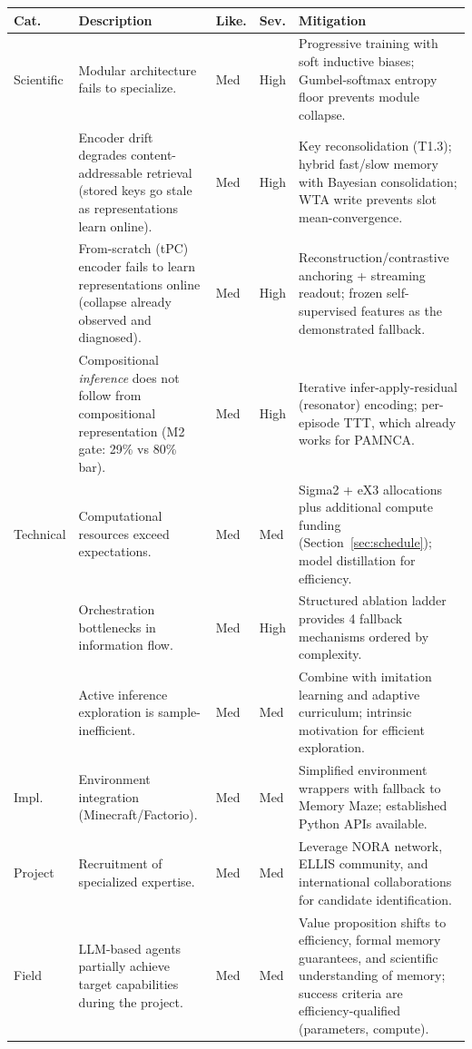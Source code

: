 {\small
\noindent
\begin{tabularx}{\textwidth}{@{}p{1.3cm}Xp{0.8cm}p{0.8cm}X@{}}
\toprule
\textbf{Cat.} & \textbf{Description} & \textbf{Like.} & \textbf{Sev.} & \textbf{Mitigation} \\
\midrule
Scientific & Modular architecture fails to specialize. & Med & High & Progressive training with soft inductive biases; Gumbel-softmax entropy floor prevents module collapse. \\
 & Encoder drift degrades content-addressable retrieval (stored keys go stale as representations learn online). & Med & High & Key reconsolidation (T1.3); hybrid fast/slow memory with Bayesian consolidation; WTA write prevents slot mean-convergence. \\
 & From-scratch (tPC) encoder fails to learn representations online (collapse already observed and diagnosed). & Med & High & Reconstruction/contrastive anchoring + streaming readout; frozen self-supervised features as the demonstrated fallback. \\
 & Compositional \textit{inference} does not follow from compositional representation (M2 gate: 29\% vs 80\% bar). & Med & High & Iterative infer-apply-residual (resonator) encoding; per-episode TTT, which already works for PAMNCA. \\
Technical & Computational resources exceed expectations. & Med & Med & Sigma2 + eX3 allocations plus additional compute funding (Section~\ref{sec:schedule}); model distillation for efficiency. \\
 & Orchestration bottlenecks in information flow. & Med & High & Structured ablation ladder provides 4 fallback mechanisms ordered by complexity. \\
 & Active inference exploration is sample-inefficient. & Med & Med & Combine with imitation learning and adaptive curriculum; intrinsic motivation for efficient exploration. \\
Impl. & Environment integration (Minecraft/Factorio). & Med & Med & Simplified environment wrappers with fallback to Memory Maze; established Python APIs available. \\
Project & Recruitment of specialized expertise. & Med & Med & Leverage NORA network, ELLIS community, and international collaborations for candidate identification. \\
Field & LLM-based agents partially achieve target capabilities during the project. & Med & Med & Value proposition shifts to efficiency, formal memory guarantees, and scientific understanding of memory; success criteria are efficiency-qualified (parameters, compute). \\
\bottomrule
\end{tabularx}
}

